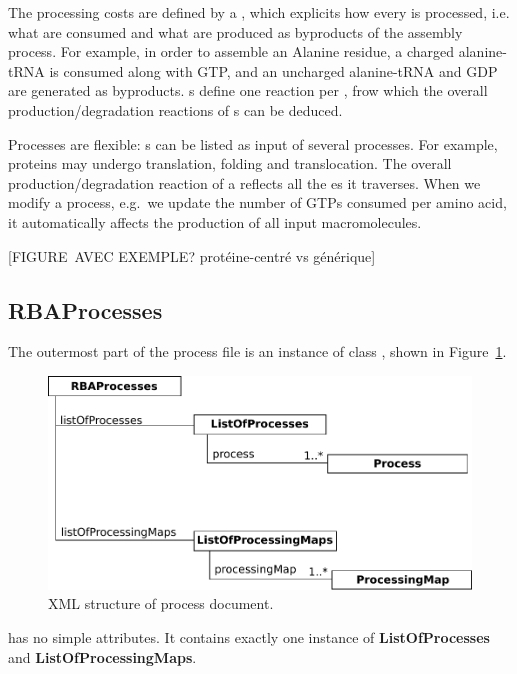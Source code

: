 The processing costs are defined by a \processingmap{},
which explicits how every \component{} is processed, i.e.
what \species{} are consumed and what \species{} are
produced as byproducts of the assembly process.
For example, in order to assemble an Alanine residue,
a charged alanine-tRNA is consumed along with GTP,
and an uncharged alanine-tRNA and GDP are generated as byproducts.
\processingmap{}s define one reaction per \component{}, frow which
the overall production/degradation reactions of \macromolecule{}s can be deduced.

Processes are flexible:
\macromolecule{}s can be listed as input of several processes.
For example, proteins may undergo translation, folding and translocation.
The overall production/degradation reaction of a \macromolecule{} reflects
all the \process{}es it traverses.
When we modify a process,
e.g.\ we update the number of GTPs consumed per amino acid,
it automatically affects the production of all input macromolecules.


[FIGURE AVEC EXEMPLE? protéine-centré vs générique]

\subsection{RBAProcesses}
\label{sec:rba_processes}

The outermost part of the process file is an instance of class
\rbaprocesses, shown in Figure~\ref{fig:processes_doc}.

\begin{figure}
  \centering
  \includegraphics[scale=0.8]{figures/processes_doc}
  \caption{XML structure of process document.}
\label{fig:processes_doc}
\end{figure}

\rbaprocesses{} has no simple attributes.
It contains exactly one instance of \textbf{ListOfProcesses}
and \textbf{ListOfProcessingMaps}.


